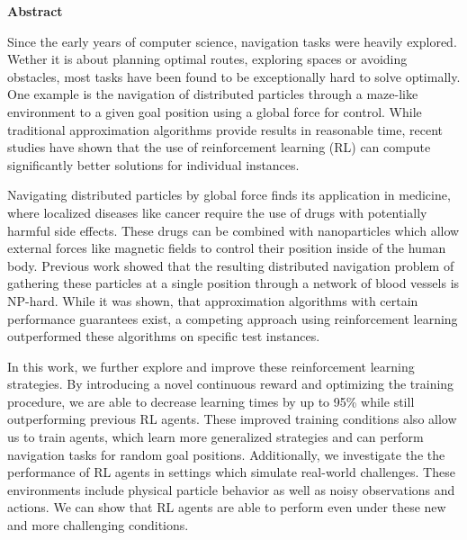 \documentclass[%
  a4paper,%
  11pt,%
  style=print,
  blue,%
  bibliography=totoc,
  nexus,
  lnum,
  extramargin,
  table
  ]{tubsbook}
\begin{document}
\thispagestyle{plain} %
\centerline{\bfseries Abstract}
\vspace*{1em}
\noindent
Since the early years of computer science, navigation tasks were heavily explored. Wether it is about planning optimal routes, exploring spaces or avoiding obstacles, most tasks have been found to be exceptionally hard to solve optimally. One example is the navigation of distributed particles through a maze-like environment to a given goal position using a global force for control. While traditional approximation algorithms provide results in reasonable time, recent studies have shown that the use of reinforcement learning (RL) can compute significantly better solutions for individual instances.

Navigating distributed particles by global force finds its application in medicine, where localized diseases like cancer require the use of drugs with potentially harmful side effects. These drugs can be combined with nanoparticles which allow external forces like magnetic fields to control their position inside of the human body. Previous work showed that the resulting distributed navigation problem of gathering these particles at a single position through a network of blood vessels is NP-hard. While it was shown, that approximation algorithms with certain performance guarantees exist, a competing approach using reinforcement learning outperformed these algorithms on specific test instances.

In this work, we further explore and improve these reinforcement learning strategies. By introducing a novel continuous reward and optimizing the training procedure, we are able to decrease learning times by up to 95\% while still outperforming previous RL agents. These improved training conditions also allow us to train agents, which learn more generalized strategies and can perform navigation tasks for random goal positions. Additionally, we investigate the the performance of RL agents in settings which simulate real-world challenges. These environments include physical particle behavior as well as noisy observations and actions. We can show that RL agents are able to perform even under these new and more challenging conditions.

\cleardoublepage

\tableofcontents
\cleardoublepage

\listoffigures
\cleardoublepage

\listoftables
\cleardoublepage
\end{document}
